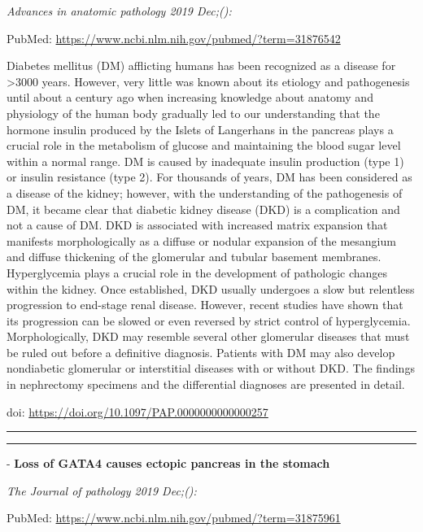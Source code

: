 \documentclass[
]{article}
\renewcommand{\linethickness}{0.05em}
\begin{document}
\emph{Advances in anatomic pathology 2019 Dec;():}

PubMed: \url{https://www.ncbi.nlm.nih.gov/pubmed/?term=31876542}

Diabetes mellitus (DM) afflicting humans has been recognized as a
disease for \textgreater3000 years. However, very little was known about
its etiology and pathogenesis until about a century ago when increasing
knowledge about anatomy and physiology of the human body gradually led
to our understanding that the hormone insulin produced by the Islets of
Langerhans in the pancreas plays a crucial role in the metabolism of
glucose and maintaining the blood sugar level within a normal range. DM
is caused by inadequate insulin production (type 1) or insulin
resistance (type 2). For thousands of years, DM has been considered as a
disease of the kidney; however, with the understanding of the
pathogenesis of DM, it became clear that diabetic kidney disease (DKD)
is a complication and not a cause of DM. DKD is associated with
increased matrix expansion that manifests morphologically as a diffuse
or nodular expansion of the mesangium and diffuse thickening of the
glomerular and tubular basement membranes. Hyperglycemia plays a crucial
role in the development of pathologic changes within the kidney. Once
established, DKD usually undergoes a slow but relentless progression to
end-stage renal disease. However, recent studies have shown that its
progression can be slowed or even reversed by strict control of
hyperglycemia. Morphologically, DKD may resemble several other
glomerular diseases that must be ruled out before a definitive
diagnosis. Patients with DM may also develop nondiabetic glomerular or
interstitial diseases with or without DKD. The findings in nephrectomy
specimens and the differential diagnoses are presented in detail.

doi: \url{https://doi.org/10.1097/PAP.0000000000000257}

\begin{center}\rule{0.5\linewidth}{\linethickness}\end{center}

\begin{center}\rule{0.5\linewidth}{\linethickness}\end{center}

- \textbf{Loss of GATA4 causes ectopic pancreas in the stomach}

\emph{The Journal of pathology 2019 Dec;():}

PubMed: \url{https://www.ncbi.nlm.nih.gov/pubmed/?term=31875961}
\end{document}
